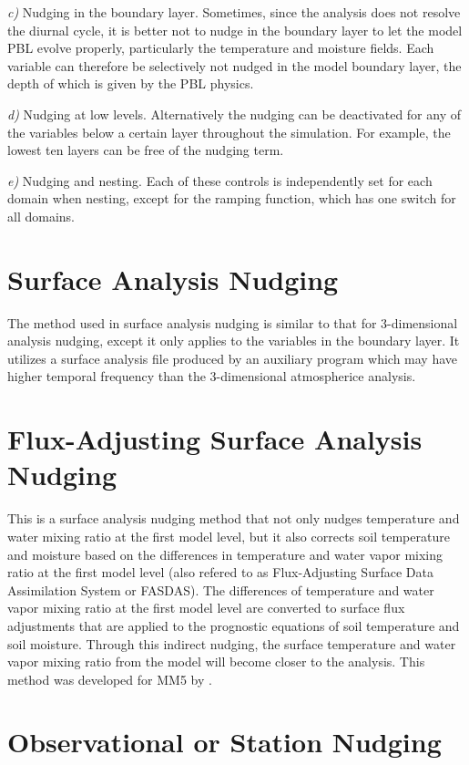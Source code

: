 {\it c)} Nudging in the boundary layer. Sometimes, since the analysis does not resolve the diurnal cycle, it is better not to nudge in the boundary layer to let the model PBL evolve properly, particularly the temperature and moisture fields. Each variable can therefore be selectively not nudged in the model boundary layer, the depth of which is given by the PBL physics.

{\it d)} Nudging at low levels. Alternatively the nudging can be deactivated for any of the variables below a certain layer throughout the simulation. For example, the lowest ten layers can be free of the nudging term. 

{\it e)} Nudging and nesting. Each of these controls is independently set for each domain when nesting, except for the ramping function, which has one switch for all domains.

\section{Surface Analysis Nudging}

The method used in surface analysis nudging is similar to that for 3-dimensional analysis nudging, except it only applies to the variables in the boundary layer. It utilizes a surface analysis file produced by an auxiliary program which may have higher temporal frequency than the 3-dimensional atmospherice analysis. 

\section{Flux-Adjusting Surface Analysis Nudging}

This is a surface analysis nudging method that not only nudges temperature and water mixing ratio at the first model level, but it also corrects soil temperature and moisture based on the differences in temperature and water vapor mixing ratio at the first model level (also refered to as Flux-Adjusting Surface Data Assimilation System or FASDAS). The differences of temperature and water vapor mixing ratio at the first model level are converted to surface flux adjustments that are applied to the prognostic equations of soil temperature and soil moisture. Through this indirect nudging, the surface temperature and water vapor mixing ratio from the model will become closer to the analysis. This method was developed for MM5 by \citet{alapaty08}.

\section{Observational or Station Nudging}

